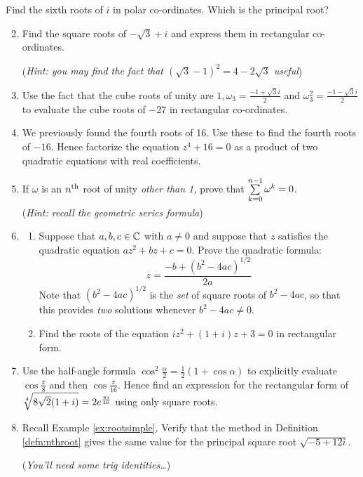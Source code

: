 \begin{exercises}
	\exstart Find the sixth roots of $i$ in polar co-ordinates. Which is the principal root?
	\begin{enumerate}\setcounter{enumi}{1}
  	\item Find the square roots of $-\sqrt 3+i$ and express them in rectangular co-ordinates.\par
  	(\emph{Hint: you may find the fact that $(\sqrt 3-1)^2=4-2\sqrt 3$ useful})
  
	  \item Use the fact that the cube roots of unity are $1,\omega_3=\frac{-1+\sqrt 3 i}2$ and $\omega_3^2=\frac{-1-\sqrt 3 i}2$ to evaluate the cube roots of $-27$ in rectangular co-ordinates.
	 
	  \item We previously found the fourth roots of 16. Use these to find the fourth roots of $-16$. Hence factorize the equation $z^4+16=0$ as a product of two quadratic equations with real coefficients.
	  
	  \item If $\omega$ is an $n\textsuperscript{th}$ root of unity \emph{other than 1,} prove that $\smash[b]{\sum\limits_{k=0}^{n-1}\omega^k=0}$.\par
	  (\emph{Hint: recall the geometric series formula})
	  
	  \item\begin{enumerate}
	    \item Suppose that $a,b,c\in\mathbb{C}$ with $a\neq 0$ and suppose that $z$ satisfies the quadratic equation $az^2+bz+c=0$. Prove the quadratic formula:
	    \[
	    	z=\frac{-b+(b^2-4ac)^{1/2}}{2a}
	    \]
	    Note that $(b^2-4ac)^{1/2}$ is the \emph{set} of square roots of $b^2-4ac$, so that this provides \emph{two} solutions whenever $b^2-4ac\neq 0$.
	    \item Find the roots of the equation $iz^2+(1+i)z+3=0$ in rectangular form.
	  \end{enumerate} 
	  
	  \item\label{ex:fourthrootrect} Use the half-angle formula $\cos^2\!\frac\alpha 2=\frac 12(1+\cos\alpha)$ to explicitly evaluate $\cos\frac\pi 8$ and then $\cos\frac\pi{16}$. Hence find an expression for the rectangular form of $\sqrt[4]{8\sqrt 2(1+i)}=2e^{\frac{\pi i}{16}}$ using only square roots.
	  
	  \item Recall Example \ref{ex:rootsimple}. Verify that the method in Definition \ref{defn:nthroot} gives the same value for the principal square root $\sqrt{-5+12i}$.\par
	  (\emph{You'll need some trig identities\ldots})
	
	\end{enumerate}
\end{exercises}